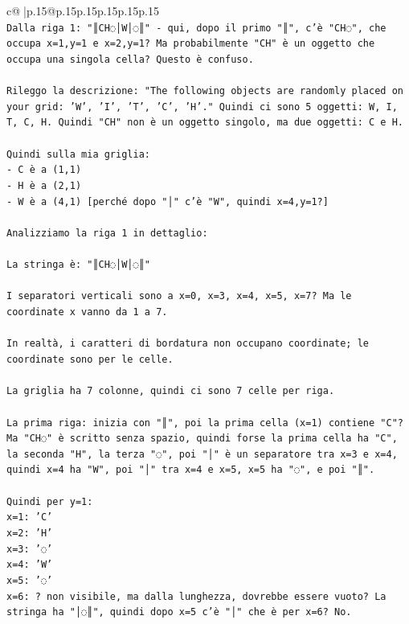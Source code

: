 \documentclass{article}
\begin{document}
{\begin{supertabular}{c@{$\;$}|p{.15\linewidth}@{}p{.15\linewidth}p{.15\linewidth}p{.15\linewidth}p{.15\linewidth}p{.15\linewidth}}
{{{\\ 
\texttt{Dalla riga 1: "║CH◌│W│◌║" {-} qui, dopo il primo "║", c'è "CH◌", che occupa x=1,y=1 e x=2,y=1? Ma probabilmente "CH" è un oggetto che occupa una singola cella? Questo è confuso.} \\
\\ 
\texttt{Rileggo la descrizione: "The following objects are randomly placed on your grid: 'W', 'I', 'T', 'C', 'H'." Quindi ci sono 5 oggetti: W, I, T, C, H. Quindi "CH" non è un oggetto singolo, ma due oggetti: C e H.} \\
\\ 
\texttt{Quindi sulla mia griglia:} \\
\texttt{{-} C è a (1,1)} \\
\texttt{{-} H è a (2,1)} \\
\texttt{{-} W è a (4,1)  {[}perché dopo "│" c'è "W", quindi x=4,y=1?{]}} \\
\\ 
\texttt{Analizziamo la riga 1 in dettaglio:} \\
\\ 
\texttt{La stringa è: "║CH◌│W│◌║"} \\
\\ 
\texttt{I separatori verticali sono a x=0, x=3, x=4, x=5, x=7? Ma le coordinate x vanno da 1 a 7.} \\
\\ 
\texttt{In realtà, i caratteri di bordatura non occupano coordinate; le coordinate sono per le celle.} \\
\\ 
\texttt{La griglia ha 7 colonne, quindi ci sono 7 celle per riga.} \\
\\ 
\texttt{La prima riga: inizia con "║", poi la prima cella (x=1) contiene "C"?} \\
\texttt{Ma "CH◌" è scritto senza spazio, quindi forse la prima cella ha "C", la seconda "H", la terza "◌", poi "│" è un separatore tra x=3 e x=4, quindi x=4 ha "W", poi "│" tra x=4 e x=5, x=5 ha "◌", e poi "║".} \\
\\ 
\texttt{Quindi per y=1:} \\
\texttt{x=1: 'C'} \\
\texttt{x=2: 'H'} \\
\texttt{x=3: '◌'} \\
\texttt{x=4: 'W'} \\
\texttt{x=5: '◌'} \\
\texttt{x=6: ? non visibile, ma dalla lunghezza, dovrebbe essere vuoto? La stringa ha "│◌║", quindi dopo x=5 c'è "│" che è per x=6? No.} \\
}}}
\end{supertabular}}
\end{document}
